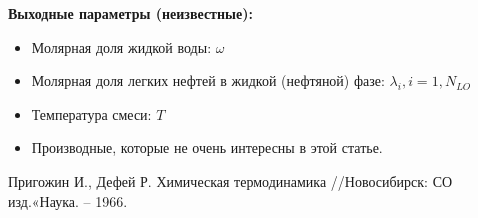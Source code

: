 \documentclass[12pt]{article}
\begin{document}
\textbf{Выходные параметры (неизвестные):}
\begin{itemize}
\item Молярная доля жидкой воды: $\omega$
\item Молярная доля легких нефтей в жидкой (нефтяной) фазе: $\lambda_i, i=1,N_{LO}$
\item Температура смеси: $T$
\item Производные, которые не очень интересны в этой статье.
\end{itemize}

\begin{thebibliography}{9}
     Пригожин И., Дефей Р. Химическая термодинамика //Новосибирск: СО изд.«Наука. – 1966.
\end{thebibliography}
\end{document}
